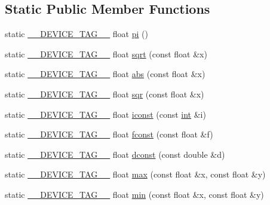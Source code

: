 \subsection*{Static Public Member Functions}
\begin{DoxyCompactItemize}
\item 
static \hyperlink{scalar__traits_8h_a2396f3e69fc9792ad01b8b14a1a425e3}{\-\_\-\-\_\-\-D\-E\-V\-I\-C\-E\-\_\-\-T\-A\-G\-\_\-\-\_\-} float \hyperlink{structscalar__traits_3_01float_01_4_a1ab54be3cdc6ed4a1f2550994560617c}{pi} ()
\item 
static \hyperlink{scalar__traits_8h_a2396f3e69fc9792ad01b8b14a1a425e3}{\-\_\-\-\_\-\-D\-E\-V\-I\-C\-E\-\_\-\-T\-A\-G\-\_\-\-\_\-} float \hyperlink{structscalar__traits_3_01float_01_4_aade2b9cb1ef3d7ec43d54b9cfb8969ec}{sqrt} (const float \&x)
\item 
static \hyperlink{scalar__traits_8h_a2396f3e69fc9792ad01b8b14a1a425e3}{\-\_\-\-\_\-\-D\-E\-V\-I\-C\-E\-\_\-\-T\-A\-G\-\_\-\-\_\-} float \hyperlink{structscalar__traits_3_01float_01_4_aa852fb32546b054de803dad2c20ab6e0}{abs} (const float \&x)
\item 
static \hyperlink{scalar__traits_8h_a2396f3e69fc9792ad01b8b14a1a425e3}{\-\_\-\-\_\-\-D\-E\-V\-I\-C\-E\-\_\-\-T\-A\-G\-\_\-\-\_\-} float \hyperlink{structscalar__traits_3_01float_01_4_afe1ec7f0bb697378b2e26480c5872ac3}{sqr} (const float \&x)
\item 
static \hyperlink{scalar__traits_8h_a2396f3e69fc9792ad01b8b14a1a425e3}{\-\_\-\-\_\-\-D\-E\-V\-I\-C\-E\-\_\-\-T\-A\-G\-\_\-\-\_\-} float \hyperlink{structscalar__traits_3_01float_01_4_a29848e2a80fb13050f3670f689a529af}{iconst} (const \hyperlink{classint}{int} \&i)
\item 
static \hyperlink{scalar__traits_8h_a2396f3e69fc9792ad01b8b14a1a425e3}{\-\_\-\-\_\-\-D\-E\-V\-I\-C\-E\-\_\-\-T\-A\-G\-\_\-\-\_\-} float \hyperlink{structscalar__traits_3_01float_01_4_a72e06af873e91d882981c634a8dcda78}{fconst} (const float \&f)
\item 
static \hyperlink{scalar__traits_8h_a2396f3e69fc9792ad01b8b14a1a425e3}{\-\_\-\-\_\-\-D\-E\-V\-I\-C\-E\-\_\-\-T\-A\-G\-\_\-\-\_\-} float \hyperlink{structscalar__traits_3_01float_01_4_a7261d9971e8c756f2d6421e4c420951c}{dconst} (const double \&d)
\item 
static \hyperlink{scalar__traits_8h_a2396f3e69fc9792ad01b8b14a1a425e3}{\-\_\-\-\_\-\-D\-E\-V\-I\-C\-E\-\_\-\-T\-A\-G\-\_\-\-\_\-} float \hyperlink{structscalar__traits_3_01float_01_4_ab8fbbb5fa7081320c19e7ac0098a7de3}{max} (const float \&x, const float \&y)
\item 
static \hyperlink{scalar__traits_8h_a2396f3e69fc9792ad01b8b14a1a425e3}{\-\_\-\-\_\-\-D\-E\-V\-I\-C\-E\-\_\-\-T\-A\-G\-\_\-\-\_\-} float \hyperlink{structscalar__traits_3_01float_01_4_a353cda38d0983c1a7c5f88414a2ff680}{min} (const float \&x, const float \&y)
\end{DoxyCompactItemize}
